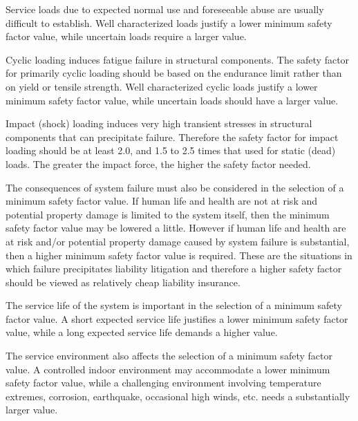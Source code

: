 Service loads due to expected normal use and foreseeable abuse are usually difficult to establish. Well characterized loads justify a lower minimum safety factor value, while uncertain loads require a larger value.

Cyclic loading induces fatigue failure in structural components. The safety factor for primarily cyclic loading should be based on the endurance limit rather than on yield or tensile strength. Well characterized cyclic loads justify a lower minimum safety factor value, while uncertain loads should have a larger value.

Impact (shock) loading induces very high transient stresses in structural components that can precipitate failure. Therefore the safety factor for impact loading should be at least 2.0, and 1.5 to 2.5 times that used for static (dead) loads. The greater the impact force, the higher the safety factor needed.

The consequences of system failure must also be considered in the selection of a minimum safety factor value. If human life and health are not at risk and potential property damage is limited to the system itself, then the minimum safety factor value may be lowered a little. However if human life and health are at risk and/or potential property damage caused by system failure is substantial, then a higher minimum safety factor value is required. These are the situations in which failure precipitates liability litigation and therefore a higher safety factor should be viewed as relatively cheap liability insurance.

The service life of the system is important in the selection of a minimum safety factor value. A short expected service life justifies a lower minimum safety factor value, while a long expected service life demands a higher value.

The service environment also affects the selection of a minimum safety factor value. A controlled indoor environment may accommodate a lower minimum safety factor value, while a challenging environment involving temperature extremes, corrosion, earthquake, occasional high winds, etc. needs a substantially larger value.


